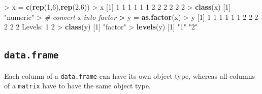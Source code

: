 \documentclass[]{article}
\newenvironment{Shaded}{\begin{snugshade}}{\end{snugshade}}
\newcommand{\KeywordTok}[1]{\textcolor[rgb]{0.13,0.29,0.53}{\textbf{{#1}}}}
\newcommand{\DecValTok}[1]{\textcolor[rgb]{0.00,0.00,0.81}{{#1}}}
\newcommand{\StringTok}[1]{\textcolor[rgb]{0.31,0.60,0.02}{{#1}}}
\newcommand{\CommentTok}[1]{\textcolor[rgb]{0.56,0.35,0.01}{\textit{{#1}}}}
\newcommand{\ErrorTok}[1]{\textcolor[rgb]{0.64,0.00,0.00}{\textbf{{#1}}}}
\newcommand{\NormalTok}[1]{{#1}}
\begin{document}
\begin{Shaded}
\begin{Highlighting}[]
\NormalTok{>}\StringTok{ }\NormalTok{x =}\StringTok{ }\KeywordTok{c}\NormalTok{(}\KeywordTok{rep}\NormalTok{(}\DecValTok{1}\NormalTok{,}\DecValTok{6}\NormalTok{),}\KeywordTok{rep}\NormalTok{(}\DecValTok{2}\NormalTok{,}\DecValTok{6}\NormalTok{))}
\NormalTok{>}\StringTok{ }\NormalTok{x}
 \NormalTok{[}\DecValTok{1}\NormalTok{] }\DecValTok{1} \DecValTok{1} \DecValTok{1} \DecValTok{1} \DecValTok{1} \DecValTok{1} \DecValTok{2} \DecValTok{2} \DecValTok{2} \DecValTok{2} \DecValTok{2} \DecValTok{2}
\NormalTok{>}\StringTok{ }\KeywordTok{class}\NormalTok{(x)}
\NormalTok{[}\DecValTok{1}\NormalTok{] }\StringTok{"numeric"}
\NormalTok{>}\StringTok{ }\CommentTok{# convert x into factor}
\ErrorTok{>}\StringTok{ }\NormalTok{y =}\StringTok{ }\KeywordTok{as.factor}\NormalTok{(x)}
\NormalTok{>}\StringTok{ }\NormalTok{y}
 \NormalTok{[}\DecValTok{1}\NormalTok{] }\DecValTok{1} \DecValTok{1} \DecValTok{1} \DecValTok{1} \DecValTok{1} \DecValTok{1} \DecValTok{2} \DecValTok{2} \DecValTok{2} \DecValTok{2} \DecValTok{2} \DecValTok{2}
\NormalTok{Levels:}\StringTok{ }\DecValTok{1} \DecValTok{2}
\NormalTok{>}\StringTok{ }\KeywordTok{class}\NormalTok{(y)}
\NormalTok{[}\DecValTok{1}\NormalTok{] }\StringTok{"factor"}
\NormalTok{>}\StringTok{ }\KeywordTok{levels}\NormalTok{(y)}
\NormalTok{[}\DecValTok{1}\NormalTok{] }\StringTok{"1"} \StringTok{"2"}
\end{Highlighting}
\end{Shaded}

\subsection{\texorpdfstring{\texttt{data.frame}}{data.frame}}\label{data.frame}

Each column of a \texttt{data.frame} can have its own object type,
whereas all columns of a \texttt{matrix} have to have the same object
type.
\end{document}
